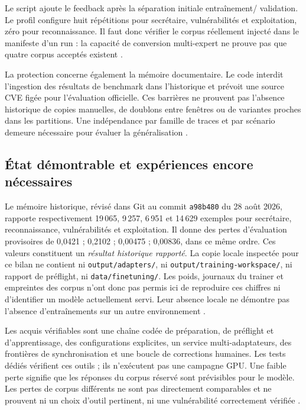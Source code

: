 \documentclass[11pt,a4paper]{article}
\begin{document}
Le script ajoute le feedback après la séparation initiale entraînement/
validation. Le profil configure huit répétitions pour secrétaire,
vulnérabilités et exploitation, zéro pour reconnaissance. Il faut donc vérifier
le corpus réellement injecté dans le manifeste d'un run : la capacité de
conversion multi-expert ne prouve pas que quatre corpus acceptés existent
\cite{ml-config,ml-train}.

La protection concerne également la mémoire documentaire. Le code interdit
l'ingestion des résultats de benchmark dans l'historique et prévoit une source
CVE figée pour l'évaluation officielle. Ces barrières ne prouvent pas l'absence
historique de copies manuelles, de doublons entre fenêtres ou de variantes
proches dans les partitions. Une indépendance par famille de traces et par
scénario demeure nécessaire pour évaluer la généralisation
\cite{arch-memoire,arch-connaissances,ml-learning}.

\subsection{État démontrable et expériences encore nécessaires}

Le mémoire historique, révisé dans Git au commit \texttt{a98b480} du
28 août 2026, rapporte respectivement 19\,065, 9\,257, 6\,951 et 14\,629 exemples
pour secrétaire, reconnaissance, vulnérabilités et exploitation. Il donne des
pertes d'évaluation provisoires de 0,0421 ; 0,2102 ; 0,00475 ; 0,00836, dans ce
même ordre. Ces valeurs constituent un \emph{résultat historique rapporté}.
La copie locale inspectée pour ce bilan ne contient ni
\texttt{output/adapters/}, ni \texttt{output/training-workspace/}, ni rapport
de préflight, ni \texttt{data/finetuning/}. Les poids, journaux du trainer et
empreintes des corpus n'ont donc pas permis ici de reproduire ces chiffres ni
d'identifier un modèle actuellement servi. Leur absence locale ne démontre
pas l'absence d'entraînements sur un autre environnement \cite{ml-memoire}.

Les acquis vérifiables sont une chaîne codée de préparation, de préflight et
d'apprentissage, des configurations explicites, un service multi-adaptateurs,
des frontières de synchronisation et une boucle de corrections humaines.
Les tests dédiés vérifient ces outils ; ils n'exécutent pas une campagne GPU.
Une faible perte signifie que les réponses du corpus réservé sont prévisibles
pour le modèle. Les pertes de corpus différents ne sont pas directement
comparables et ne prouvent ni un choix d'outil pertinent, ni une vulnérabilité
correctement vérifiée \cite{ml-readme,ml-memoire}.
\end{document}
